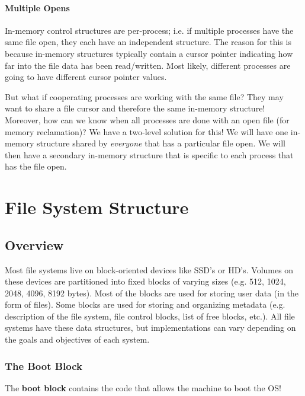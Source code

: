 \documentclass{report}
\newcommand{\definitionBegin}[1]{\begin{tcolorbox}[title={Definition: #1}]}
\newcommand{\definitionEnd}{\end{tcolorbox}}
\begin{document}
\subsubsection{Multiple Opens}
In-memory control structures are per-process; i.e. if multiple processes have the same file open,
they each have an independent structure. The reason for this is because in-memory structures
typically contain a cursor pointer indicating how far into the file data has been read/written. Most
likely, different processes are going to have different cursor pointer values.

But what if cooperating processes are working with the same file? They may want to share a file
cursor and therefore the same in-memory structure! Moreover, how can we know when all processes are
done with an open file (for memory reclamation)? We have a two-level solution for this! We will have
one in-memory structure shared by \textit{everyone} that has a particular file open. We will then have a
secondary in-memory structure that is specific to each process that has the file open.










\chapter{File System Structure}
\section{Overview}
Most file systems live on block-oriented devices like SSD's or HD's. Volumes on these devices are
partitioned into fixed blocks of varying sizes (e.g. 512, 1024, 2048, 4096, 8192 bytes). Most of the
blocks are used for storing user data (in the form of files). Some blocks are used for storing and
organizing metadata (e.g. description of the file system, file control blocks, list of free blocks,
etc.). All file systems have these data structures, but implementations can vary depending on the
goals and objectives of each system.


\subsection{The Boot Block}
\definitionBegin{Boot Block}
The \textbf{boot block} contains the code that allows the machine to boot the OS!
\definitionEnd
\end{document}

